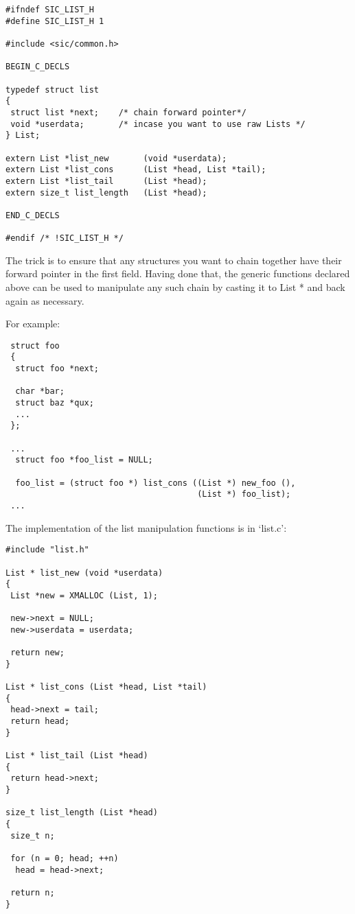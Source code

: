 \begin{Verbatim}[frame=single]
#ifndef SIC_LIST_H
#define SIC_LIST_H 1

#include <sic/common.h>

BEGIN_C_DECLS

typedef struct list 
{
 struct list *next;    /* chain forward pointer*/
 void *userdata;       /* incase you want to use raw Lists */
} List;

extern List *list_new       (void *userdata);
extern List *list_cons      (List *head, List *tail);
extern List *list_tail      (List *head);
extern size_t list_length   (List *head);

END_C_DECLS

#endif /* !SIC_LIST_H */
\end{Verbatim}

The trick is to ensure that any structures you want to chain together have 
their forward pointer in the first field. Having done that, the generic 
functions declared above can be used to manipulate any such chain by casting 
it to List * and back again as necessary. 

For example: 

\begin{Verbatim}
 struct foo 
 {
  struct foo *next;

  char *bar;
  struct baz *qux;
  ...
 };

 ...
  struct foo *foo_list = NULL;

  foo_list = (struct foo *) list_cons ((List *) new_foo (),
                                       (List *) foo_list);
 ...
\end{Verbatim}

The implementation of the list manipulation functions is in `list.c': 

\begin{Verbatim}[frame=single]
#include "list.h"

List * list_new (void *userdata)
{
 List *new = XMALLOC (List, 1);

 new->next = NULL;
 new->userdata = userdata;

 return new;
}

List * list_cons (List *head, List *tail)
{
 head->next = tail;
 return head;
}

List * list_tail (List *head)
{
 return head->next;
}

size_t list_length (List *head)
{
 size_t n;
  
 for (n = 0; head; ++n)
  head = head->next;

 return n;
}
\end{Verbatim}

